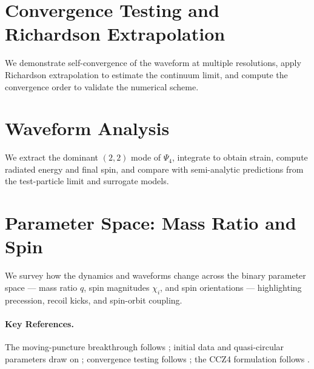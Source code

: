 \section{Convergence Testing and Richardson Extrapolation}
\label{sec:bbh-convergence}

We demonstrate self-convergence of the waveform at multiple resolutions,
apply Richardson extrapolation to estimate the continuum limit, and
compute the convergence order to validate the numerical scheme.

\section{Waveform Analysis}
\label{sec:bbh-waveform}

We extract the dominant $(2,2)$ mode of $\Psi_4$, integrate to obtain
strain, compute radiated energy and final spin, and compare with
semi-analytic predictions from the test-particle limit and surrogate
models.

\section{Parameter Space: Mass Ratio and Spin}
\label{sec:bbh-parameter-space}

We survey how the dynamics and waveforms change across the binary
parameter space --- mass ratio $q$, spin magnitudes $\chi_i$, and spin
orientations --- highlighting precession, recoil kicks, and spin-orbit
coupling.

\paragraph{Key References.}
The moving-puncture breakthrough follows \cite{Campanelli2006}; initial
data and quasi-circular parameters draw on \cite{Cook2000,Bowen1980};
convergence testing follows \cite{Baumgarte2010}; the CCZ4 formulation
follows \cite{Alic2012}.
